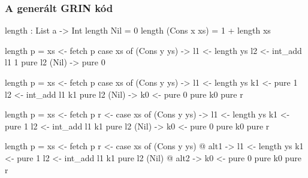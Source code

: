 \documentclass[bigger]{beamer}
\begin{document}
\begin{frame}[fragile]
\frametitle{A generált GRIN kód}

  \begin{center}
  	\begin{minipage}{0.40\textwidth}
  		\begin{haskellcode}
		length : List a -> Int
		length Nil = 0
		length (Cons x xs) 
		  = 1 + length xs
  		\end{haskellcode}
  	\end{minipage}
  	\hfill
  	\pause
  	\begin{minipage}{0.50\textwidth}
  		\begin{overprint}
 		\begin{haskellcode}
		length p =
		  xs <- fetch p
		  case xs of
		    (Cons y ys) ->
		      l1 <- length ys
		      l2 <- int_add l1 1
		      pure l2
		    (Nil) ->
		      pure 0
  		\end{haskellcode}
	  	\begin{haskellcode}
  		length p =
  		  xs <- fetch p
  		  case xs of
  		    (Cons y ys) ->
  		      l1 <- length ys
  		      k1 <- pure 1
  		      l2 <- int_add l1 k1
  		      pure l2
  		    (Nil) ->
  		      k0 <- pure 0
  		      pure k0
  		  pure r
	  	\end{haskellcode}
  		\begin{haskellcode}
		length p =
		  xs <- fetch p
		  r <- case xs of
		    (Cons y ys) ->
		      l1 <- length ys
		      k1 <- pure 1
		      l2 <- int_add l1 k1
		      pure l2
		    (Nil) ->
		      k0 <- pure 0
		      pure k0
		  pure r
  		\end{haskellcode}
  		\begin{haskellcode}
		length p =
		  xs <- fetch p
		  r <- case xs of
		    (Cons y ys) @ alt1 ->
		      l1 <- length ys
		      k1 <- pure 1
		      l2 <- int_add l1 k1
		      pure l2
		    (Nil) @ alt2 ->
		      k0 <- pure 0
		      pure k0
		  pure r
  		\end{haskellcode}
  	\end{overprint}
  	\end{minipage}
  \end{center}

\end{frame}
\end{document}
